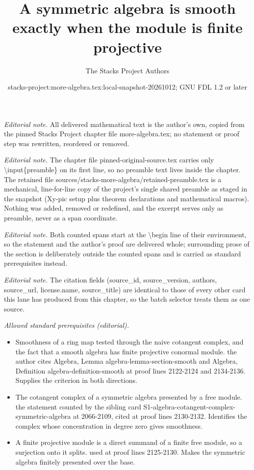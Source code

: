 \documentclass[10pt,a4paper]{amsart}
\title{A symmetric algebra is smooth exactly when the module is finite projective}
\author{The Stacks Project Authors}
\date{stacks-project:more-algebra.tex:local-snapshot-20261012; GNU FDL 1.2 or later}
\theoremstyle{plain}
\theoremstyle{definition}
\theoremstyle{remark}
\numberwithin{equation}{subsection}
\begin{document}
\maketitle
\setcounter{subsection}{1}
\noindent\textit{Editorial note.} All delivered mathematical text is the author's own, copied from the pinned Stacks Project chapter file more-algebra.tex; no statement or proof step was rewritten, reordered or removed.\par\medskip
\noindent\textit{Editorial note.} The chapter file pinned-original-source.tex carries only \textbackslash{}input\{preamble\} on its first line, so no preamble text lives inside the chapter. The retained file sources/stacks-more-algebra/retained-preamble.tex is a mechanical, line-for-line copy of the project's single shared preamble as staged in the snapshot (Xy-pic setup plus theorem declarations and mathematical macros). Nothing was added, removed or redefined, and the excerpt serves only as preamble, never as a span coordinate.\par\medskip
\noindent\textit{Editorial note.} Both counted spans start at the \textbackslash{}begin line of their environment, so the statement and the author's proof are delivered whole; surrounding prose of the section is deliberately outside the counted spans and is carried as standard prerequisites instead.\par\medskip
\noindent\textit{Editorial note.} The citation fields (source\_id, source\_version, authors, source\_url, license.name, source\_title) are identical to those of every other card this lane has produced from this chapter, so the batch selector treats them as one source.\par\medskip
\noindent\textit{Allowed standard prerequisites (editorial).}\begin{itemize}
\item Smoothness of a ring map tested through the naive cotangent complex, and the fact that a smooth algebra has finite projective conormal module. the author cites Algebra, Lemma algebra-lemma-section-smooth and Algebra, Definition algebra-definition-smooth at proof lines 2122-2124 and 2134-2136. Supplies the criterion in both directions.
\item The cotangent complex of a symmetric algebra presented by a free module. the statement counted by the sibling card S1-algebra-cotangent-complex-symmetric-algebra at 2066-2109, cited at proof lines 2130-2132. Identifies the complex whose concentration in degree zero gives smoothness.
\item A finite projective module is a direct summand of a finite free module, so a surjection onto it splits. used at proof lines 2125-2130. Makes the symmetric algebra finitely presented over the base.
\end{itemize}\medskip
\end{document}

